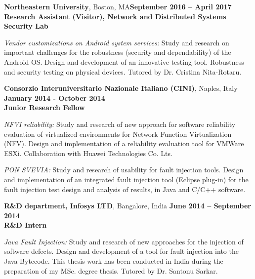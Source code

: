 \documentclass[margin,line]{resume}
\begin{document}
\begin{resume}
\textbf{Northeastern University}, Boston, MA\hfill\textbf{September 2016 -- April 2017}\\
\textbf{Research Assistant (Visitor), Network and Distributed Systems Security Lab}\hfill 
\vspace{-3mm}\\\vspace{-1mm}
\begin{list2}
	\item \filbreak\textit{Vendor customizations on Android system services:} Study and research on important challenges for the robustness (security and dependability) of the Android OS. Design and development of an innovative testing tool. Robustness and security testing on physical devices. Tutored by Dr. Cristina Nita-Rotaru.
\end{list2}

\textbf{Consorzio Interuniversitario Nazionale Italiano (CINI)}, Naples, Italy\\
\null\hfill\textbf{January 2014 - October 2014}\\
\textbf{Junior Research Fellow}\hfill 
\vspace{-3mm}\\\vspace{-1mm}
\begin{list2}
	\item \filbreak\textit{NFVI reliability:} Study and research of new approach for software reliability evaluation of virtualized environments for Network Function Virtualization (NFV). Design and implementation of a reliability evaluation tool for VMWare ESXi. Collaboration with Huawei Technologies Co. Lts.
	\item \filbreak\textit{PON SVEVIA:} Study and research of usability for fault injection tools. Design and implementation of an integrated fault injection tool (Eclipse plug-in) for the fault injection test design and analysis of results, in Java and C/C++ software.
\end{list2}


\filbreak
\textbf{R\&D department, Infosys LTD}, Bangalore, India\hfill
\textbf{June 2014 -- September 2014}\\
\textbf{R\&D Intern}\hfill 
\vspace{-3mm}\\\vspace{-1mm}
\begin{list2}
    \item \filbreak\textit{Java Fault Injection:} Study and research of new approaches for the injection of software defects. Design and development of a tool for fault injection into the Java Bytecode. This thesis work has been conducted in India during the preparation of my MSc. degree thesis. Tutored by Dr. Santonu Sarkar.
\end{list2}


\end{resume}
\end{document}
